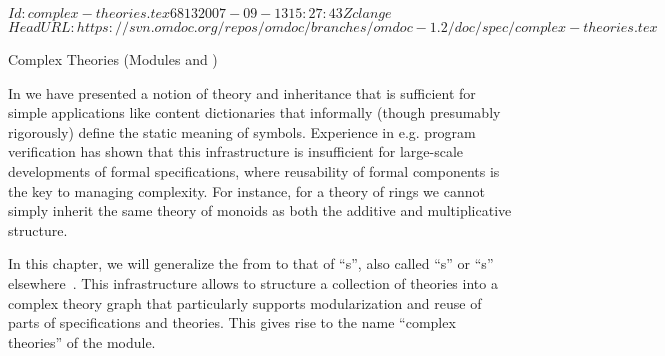 \svnInfo $Id: complex-theories.tex 6813 2007-09-13 15:27:43Z clange $
\svnKeyword $HeadURL: https://svn.omdoc.org/repos/omdoc/branches/omdoc-1.2/doc/spec/complex-theories.tex $

\begin{tchapter}[id=complex-theories,short=Complex Theories]{Complex Theories (Modules
    {} and {})}

  In {} we have presented a notion of theory and inheritance
  that is sufficient for simple applications like content dictionaries that informally
  (though presumably rigorously) define the static meaning of symbols. Experience in
  e.g. program verification has shown that this infrastructure is insufficient for
  large-scale developments of formal specifications, where reusability of formal
  components is the key to managing complexity. For instance, for a theory of rings we
  cannot simply inherit the same theory of monoids as both the additive and multiplicative
  structure.

  In this chapter, we will generalize the {} from
  {} to that of ``{s}'', also
  called ``{s}'' or ``{s}''
  elsewhere~\cite{Farmer93}.  This infrastructure allows to structure a collection of
  theories into a complex theory graph that particularly supports modularization and reuse
  of parts of specifications and theories. This gives rise to the name ``complex
  theories'' of the {\omdoc} module.


\end{tchapter}

